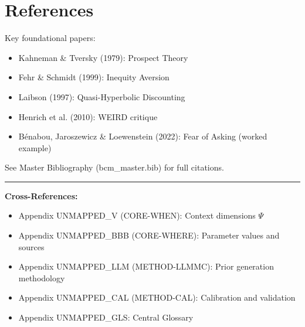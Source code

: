 
\section{References}

\nocite{bcm_master}

Key foundational papers:
\begin{itemize}
    \item Kahneman \& Tversky (1979): Prospect Theory
    \item Fehr \& Schmidt (1999): Inequity Aversion
    \item Laibson (1997): Quasi-Hyperbolic Discounting
    \item Henrich et al. (2010): WEIRD critique
    \item Bénabou, Jaroszewicz \& Loewenstein (2022): Fear of Asking (worked example)
\end{itemize}

See Master Bibliography (bcm\_master.bib) for full citations.



\vspace{1cm}
\hrule
\vspace{0.3cm}
\textbf{Cross-References:}
\begin{itemize}
    \item Appendix UNMAPPED_V (CORE-WHEN): Context dimensions $\Psi$
    \item Appendix UNMAPPED_BBB (CORE-WHERE): Parameter values and sources
    \item Appendix UNMAPPED_LLM (METHOD-LLMMC): Prior generation methodology
    \item Appendix UNMAPPED_CAL (METHOD-CAL): Calibration and validation
    \item Appendix UNMAPPED_GLS: Central Glossary
\end{itemize}


